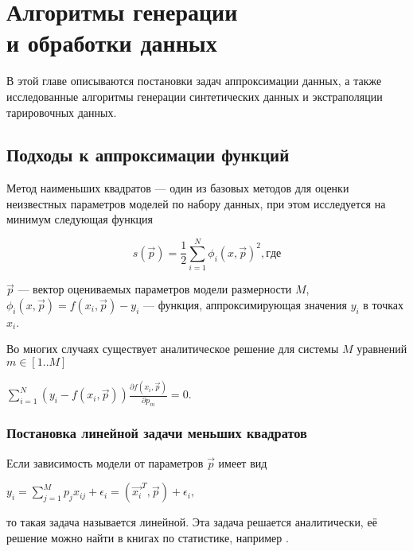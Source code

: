 \chapter[Алгоритмы генерации и обработки данных]{Алгоритмы генерации \\ и обработки данных} \label{chapt2}

В этой главе описываются постановки задач аппроксимации данных, а также исследованные алгоритмы генерации 
синтетических данных и
экстраполяции тарировочных данных. 


\section{Подходы к аппроксимации функций}\label{sect2_1}
Метод наименьших квадратов --- один из базовых методов для оценки неизвестных 
параметров моделей по набору данных, при этом исследуется на минимум
следующая функция

\begin{equation}
\label{eq:square_minimum}
s(\vec{p}) = \frac{1}{2} \displaystyle \sum_{i=1}^N \phi_i(x, \vec{p})^2 , где
\end{equation}




$\vec{p}$ --- вектор оцениваемых параметров модели размерности $M$, $\phi_i(x,\vec{p}) = f(x_i, \vec{p}) - y_i $
--- функция, аппроксимирующая значения $y_i$ в точках $x_i$.

Во многих случаях существует аналитическое решение для системы $M$ уравнений 
$m \in [1..M]$
\begin{center}
 $ \displaystyle\sum_{i = 1}^N \left( y_i - f(x_i,\vec{p})\right) 
 \frac{\partial f(x_i, \vec{p})}{\partial p_m} = 0.$
\end{center}

\subsection{Постановка линейной задачи меньших квадратов}

Если зависимость модели от параметров $\vec{p}$ имеет вид 

\begin{center}
$ y_i = \displaystyle\sum_{j=1}^{M}p_j x_{ij} + \epsilon_i = 
\left(\vec{x_i}^T,\vec{p}\right) + \epsilon_i, $ 
\end{center}
 то такая задача называется линейной. Эта задача решается аналитически, 
её решение можно найти в книгах по статистике, например \cite{linnik}.



